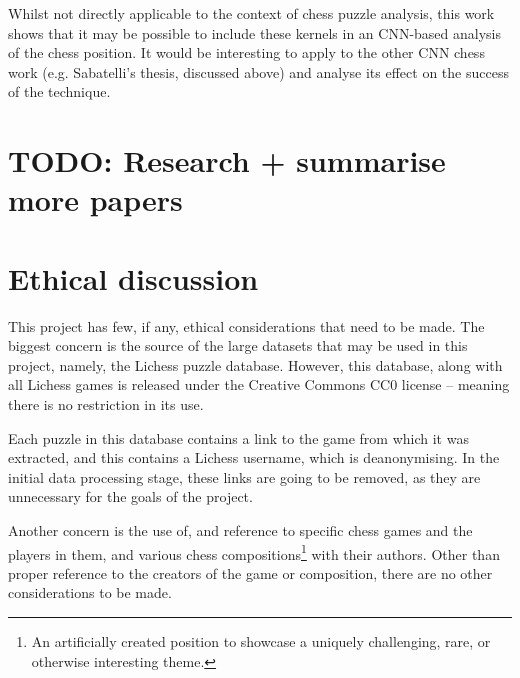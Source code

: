 Whilst not directly applicable to the context of chess puzzle analysis, this
work shows that it may be possible to include these kernels in an CNN-based
analysis of the chess position. It would be interesting to apply to the other
CNN chess work (e.g. Sabatelli's thesis,\cite{chessCNN} discussed above) and
analyse its effect on the success of the technique.

\section{TODO: Research + summarise more papers}

\section{Ethical discussion}

This project has few, if any, ethical considerations that need to be made. The
biggest concern is the source of the large datasets that may be used in this
project, namely, the Lichess puzzle database.\cite{lichessPuzzles} However,
this database, along with all Lichess games is released under the Creative
Commons CC0 license -- meaning there is no restriction in its use.

Each puzzle in this database contains a link to the game from which it was
extracted, and this contains a Lichess username, which is deanonymising. In the
initial data processing stage, these links are going to be removed, as they are
unnecessary for the goals of the project.

Another concern is the use of, and reference to specific chess games and the
players in them, and various chess compositions\footnote{An artificially
created position to showcase a uniquely challenging, rare, or otherwise
interesting theme.} with their authors. Other than proper reference to the
creators of the game or composition, there are no other considerations to be
made.

